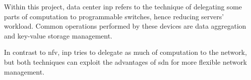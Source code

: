 Within this project, data center \gls{inp} refers to the technique of delegating some parts of computation to programmable switches, hence reducing servers' workload.
Common operations performed by these devices are data aggregation and key-value storage management.


In contrast to \gls{nfv}, \gls{inp} tries to delegate as much of computation to the network, but both techniques can exploit the advantages of \gls{sdn} for more flexible network management.